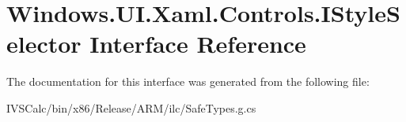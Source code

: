 \hypertarget{interface_windows_1_1_u_i_1_1_xaml_1_1_controls_1_1_i_style_selector}{}\section{Windows.\+U\+I.\+Xaml.\+Controls.\+I\+Style\+Selector Interface Reference}
\label{interface_windows_1_1_u_i_1_1_xaml_1_1_controls_1_1_i_style_selector}


The documentation for this interface was generated from the following file\+:\begin{DoxyCompactItemize}
\item 
I\+V\+S\+Calc/bin/x86/\+Release/\+A\+R\+M/ilc/Safe\+Types.\+g.\+cs\end{DoxyCompactItemize}
